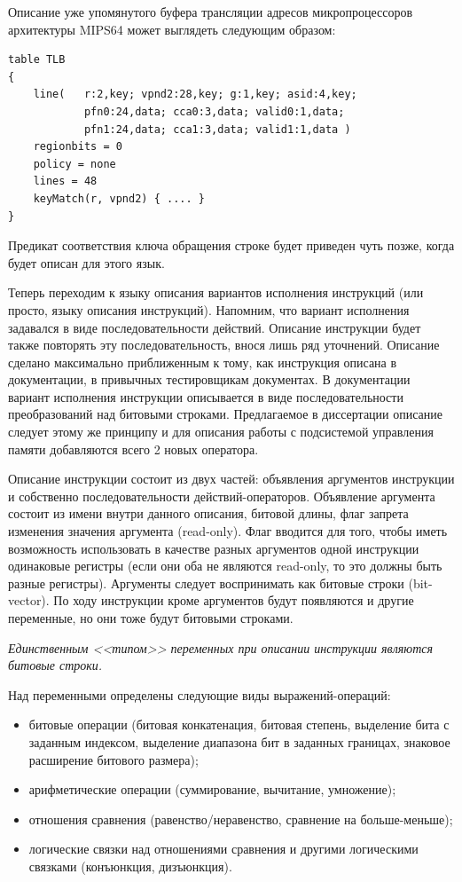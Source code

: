 \documentclass[14pt]{extreport}
\begin{document}
Описание уже упомянутого буфера трансляции адресов микропроцессоров архитектуры
MIPS64 может выглядеть следующим образом:
\begin{verbatim}
table TLB
{
    line(   r:2,key; vpnd2:28,key; g:1,key; asid:4,key;
            pfn0:24,data; cca0:3,data; valid0:1,data;
            pfn1:24,data; cca1:3,data; valid1:1,data )
    regionbits = 0
    policy = none
    lines = 48
    keyMatch(r, vpnd2) { .... }
}
\end{verbatim}

Предикат соответствия ключа обращения строке будет приведен чуть позже, когда
будет описан для этого язык.

Теперь переходим к языку описания вариантов исполнения инструкций (или просто,
языку описания инструкций). Напомним, что вариант исполнения задавался в виде
последовательности действий. Описание инструкции будет также повторять эту
последовательность, внося лишь ряд уточнений. Описание сделано максимально
приближенным к тому, как инструкция описана в документации, в привычных
тестировщикам документах. В документации вариант исполнения инструкции
описывается в виде последовательности преобразований над битовыми строками.
Предлагаемое в диссертации описание следует этому же принципу и для описания
работы с подсистемой управления памяти добавляются всего 2 новых оператора.

Описание инструкции состоит из двух частей: объявления аргументов инструкции и
собственно последовательности действий-операторов. Объявление аргумента состоит
из имени внутри данного описания, битовой длины, флаг запрета изменения значения
аргумента (read-only). Флаг вводится для того, чтобы иметь возможность
использовать в качестве разных аргументов одной инструкции одинаковые регистры
(если они оба не являются read-only, то это должны быть разные регистры).
Аргументы следует воспринимать как битовые строки (bit-vector). По ходу
инструкции кроме аргументов будут появляются и другие переменные, но они тоже
будут битовыми строками.

\emph{Единственным <<типом>> переменных при описании инструкции являются битовые
строки.}

Над переменными определены следующие виды выражений-операций:
\begin{itemize}
    \item битовые операции (битовая конкатенация, битовая степень, выделение
бита с заданным индексом, выделение диапазона бит в заданных границах, знаковое
расширение битового размера);
    \item арифметические операции (суммирование, вычитание, умножение);
    \item отношения сравнения (равенство/неравенство, сравнение на
больше-меньше);
    \item логические связки над отношениями сравнения и другими логическими
связками (конъюнкция, дизъюнкция).
\end{itemize}
\end{document}
